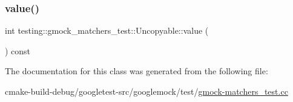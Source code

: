 \subsubsection{\texorpdfstring{value()}{value()}}
{\footnotesize\ttfamily int testing\+::gmock\+\_\+matchers\+\_\+test\+::\+Uncopyable\+::value (\begin{DoxyParamCaption}{ }\end{DoxyParamCaption}) const\hspace{0.3cm}{\ttfamily [inline]}}



The documentation for this class was generated from the following file\+:\begin{DoxyCompactItemize}
\item 
cmake-\/build-\/debug/googletest-\/src/googlemock/test/\mbox{\hyperlink{gmock-matchers__test_8cc}{gmock-\/matchers\+\_\+test.\+cc}}\end{DoxyCompactItemize}
